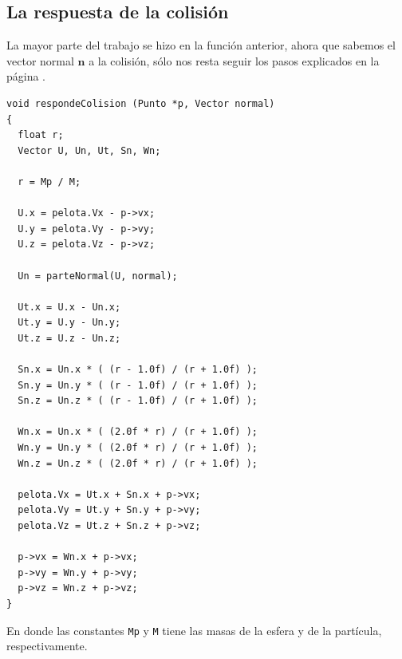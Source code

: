 \subsection{La respuesta de la colisión}
La mayor parte del trabajo se hizo en la función anterior, ahora que sabemos el vector normal $\textbf{n}$ a la colisión, sólo nos resta seguir los pasos explicados en la página \pageref{alg:elasmov}.
\begin{verbatim}
void respondeColision (Punto *p, Vector normal)
{
  float r;
  Vector U, Un, Ut, Sn, Wn;

  r = Mp / M;

  U.x = pelota.Vx - p->vx;
  U.y = pelota.Vy - p->vy;
  U.z = pelota.Vz - p->vz;

  Un = parteNormal(U, normal);

  Ut.x = U.x - Un.x;
  Ut.y = U.y - Un.y;
  Ut.z = U.z - Un.z;

  Sn.x = Un.x * ( (r - 1.0f) / (r + 1.0f) );
  Sn.y = Un.y * ( (r - 1.0f) / (r + 1.0f) );
  Sn.z = Un.z * ( (r - 1.0f) / (r + 1.0f) );

  Wn.x = Un.x * ( (2.0f * r) / (r + 1.0f) );
  Wn.y = Un.y * ( (2.0f * r) / (r + 1.0f) );
  Wn.z = Un.z * ( (2.0f * r) / (r + 1.0f) );

  pelota.Vx = Ut.x + Sn.x + p->vx;
  pelota.Vy = Ut.y + Sn.y + p->vy;
  pelota.Vz = Ut.z + Sn.z + p->vz;

  p->vx = Wn.x + p->vx;
  p->vy = Wn.y + p->vy;
  p->vz = Wn.z + p->vz;
}
\end{verbatim}
En donde las constantes \verb|Mp| y \verb|M| tiene las masas de la esfera y de la partícula, respectivamente.
